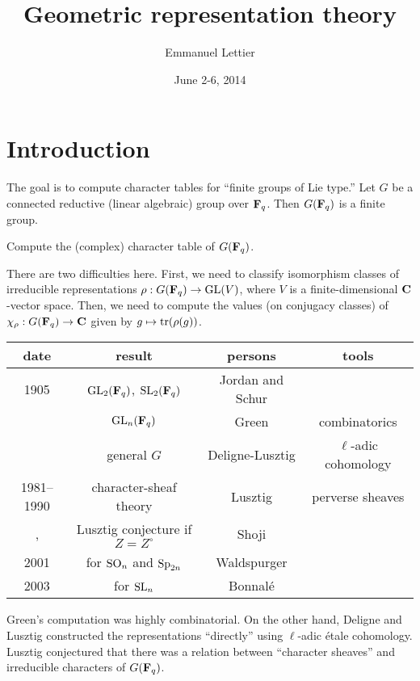 \documentclass{article}
\title{Geometric representation theory}
\author{Emmanuel Lettier}
\date{June 2-6, 2014}
\begin{document}
\maketitle
\tableofcontents





\section*{Introduction}

The goal is to compute character tables for ``finite groups of Lie type.'' Let 
$G$ be a connected reductive (linear algebraic) group over $\mathbf{F}_q$. Then 
$G(\mathbf{F}_q)$ is a finite group. 

\begin{problem}
Compute the (complex) character table of $G(\mathbf{F}_q)$. 
\end{problem}

There are two difficulties here. First, we need to classify isomorphism classes 
of irreducible representations $\rho:G(\mathbf{F}_q) \to \operatorname{GL}(V)$, where $V$ 
is a finite-dimensional $\mathbf{C}$-vector space. Then, we need to compute the values 
(on conjugacy classes) of $\chi_\rho:G(\mathbf{F}_q) \to \mathbf{C}$ given by 
$g\mapsto \operatorname{tr}(\rho(g))$. 
\begin{center}
\begin{tabular}{cccc}
date & result & persons & tools \\ \hline
1905 & $\operatorname{GL}_2(\mathbf{F}_q)$, $\operatorname{SL}_2(\mathbf{F}_q)$ & Jordan and Schur \\
\cite{g55} & $\operatorname{GL}_n(\mathbf{F}_q)$ & Green & combinatorics \\
\cite{dl76} & general $G$ & Deligne-Lusztig & $\ell$-adic cohomology \\
1981--1990 & character-sheaf theory & Lusztig & perverse sheaves \\
\cite{s95a}, \cite{s95b} & Lusztig conjecture if $Z=Z^\circ$ & Shoji \\
2001 & for $\operatorname{SO}_n$ and $\operatorname{Sp}_{2 n}$ & Waldspurger \\
2003 & for $\operatorname{SL}_n$ & Bonnal\'e 
\end{tabular}
\end{center}
Green's computation was highly combinatorial. On the other hand, Deligne and 
Lusztig constructed the representations ``directly'' using $\ell$-adic 
\'etale cohomology. Lusztig conjectured that there was a relation between 
``character sheaves'' and irreducible characters of $G(\mathbf{F}_q)$. 
\end{document}
